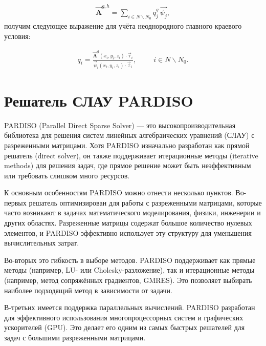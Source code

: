\begin{equation*} \label{eq_1_19}
	\begin{gathered}
		\overrightarrow{\textbf{A}}^{g,h} = \sum \limits_{i \in N \backslash N_0} q_j^g \, \overrightarrow{\psi_j},
	\end{gathered}
\end{equation*}
получим следующее выражение для учёта неоднородного главного краевого условия:

\begin{equation*} \label{eq_1_20}
	\begin{gathered}
		q_i = \frac{\overrightarrow{\textbf{A}}^g \left(x_i, y_i, z_i\right) \cdot \overrightarrow{\tau}_i}{\overrightarrow{\psi}_i \left(x_i, y_i, z_i\right) \cdot \overrightarrow{\tau}_i}, \hspace{1cm} i \in N \backslash N_0.
	\end{gathered}
\end{equation*}

\section{Решатель СЛАУ PARDISO}

PARDISO (Parallel Direct Sparse Solver) — это высокопроизводительная библиотека для решения систем линейных алгебраических уравнений (СЛАУ) с разреженными матрицами. Хотя PARDISO изначально разработан как прямой решатель (direct solver), он также поддерживает итерационные методы (iterative methods) для решения задач, где прямое решение может быть неэффективным или требовать слишком много ресурсов.

К основным особенностям PARDISO можно отнести несколько пунктов. Во-первых решатель оптимизирован для работы с разреженными матрицами, которые часто возникают в задачах математического моделирования, физики, инженерии и других областях. Разреженные матрицы содержат большое количество нулевых элементов, и PARDISO эффективно использует эту структуру для уменьшения вычислительных затрат.

Во-вторых это гибкость в выборе методов. PARDISO поддерживает как прямые методы (например, LU- или Cholesky-разложение), так и итерационные методы (например, метод сопряжённых градиентов, GMRES). Это позволяет выбирать наиболее подходящий метод в зависимости от задачи.

В-третьих имеется поддержка параллельных вычислений. PARDISO разработан для эффективного использования многопроцессорных систем и графических ускорителей (GPU). Это делает его одним из самых быстрых решателей для задач с большими разреженными матрицами.

